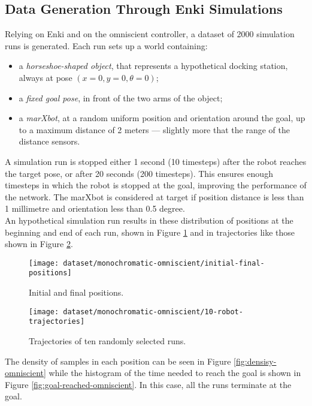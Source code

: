 \subsection{Data Generation Through Enki Simulations}
Relying on Enki and on the omniscient controller, a dataset of 2000 simulation 
runs is generated. 
Each run sets up a world containing:
\begin{itemize}
	\item a \emph{horseshoe-shaped object}, that represents a hypothetical 
	docking 
	station, always at pose $(x=0, y=0, \theta=0)$;
	\item a \emph{fixed goal pose}, in front of the two arms of the object;
	\item a \emph{marXbot}, at a random uniform position and orientation 
	around the 
	goal, up to a maximum distance of 2 meters --- slightly more that the range 
	of the distance sensors.\\
\end{itemize}

A simulation run is stopped either 1 second (10 timesteps) after the robot 
reaches the target pose, or after 20 seconds (200 timesteps). This ensures 
enough timesteps in which the robot is stopped at the goal, improving 
the performance of the network. The marXbot is considered at target if position 
distance is less than 1 millimetre and orientation less than 0.5 degree.
\\

An hypothetical simulation run results in these distribution of positions at 
the beginning and end of each run, shown 
in Figure \ref{fig:initial-final-positions-omniscient} and in trajectories like 
those shown in Figure \ref{fig:trajectories-omniscient}.

\begin{figure}[htbp]
\centerline{\texttt{[image: dataset/monochromatic-omniscient/initial-final-positions]}}
	\caption{Initial and final positions.}
	\label{fig:initial-final-positions-omniscient}
\end{figure}

\begin{figure}[htbp]
\centerline{\texttt{[image: dataset/monochromatic-omniscient/10-robot-trajectories]}}
	\caption{Trajectories of ten randomly selected runs.}
	\label{fig:trajectories-omniscient}
\end{figure}

The density of samples in each position can be seen in Figure 
\ref{fig:densisy-omniscient} while the histogram of the time needed to reach 
the goal is shown in Figure \ref{fig:goal-reached-omniscient}. In this case, 
all the runs terminate at the goal.\\


